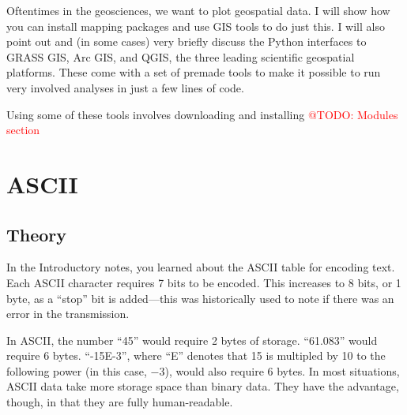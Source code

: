 \documentclass[a4paper,10pt]{scrartcl}
\makeatletter
\newcommand{\todo}[1]{\textcolor{red}{@TODO: #1}}
\makeatother
\begin{document}
Oftentimes in the geosciences, we want to plot geospatial data. I will show how you can install mapping packages and use GIS tools to do just this. I will also point out and (in some cases) very briefly discuss the Python interfaces to GRASS GIS, Arc GIS, and QGIS, the three leading scientific geospatial platforms. These come with a set of premade tools to make it possible to run very involved analyses in just a few lines of code.

Using some of these tools involves downloading and installing \todo{Modules section}

\section{ASCII}

\subsection{Theory}

In the Introductory notes, you learned about the ASCII table for encoding text. Each ASCII character requires 7 bits to be encoded. This increases to 8 bits, or 1 byte, as a ``stop'' bit is added---this was historically used to note if there was an error in the transmission.

In ASCII, the number ``45'' would require 2 bytes of storage. ``61.083'' would require 6 bytes. ``-15E-3'', where ``E'' denotes that 15 is multipled by 10 to the following power (in this case, $-3$), would also require 6 bytes. In most situations, ASCII data take more storage space than binary data. They have the advantage, though, in that they are fully human-readable.
\end{document}
